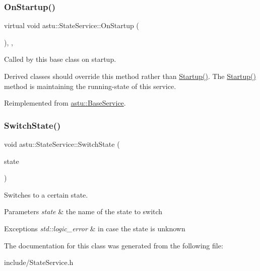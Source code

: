 \subsubsection{\texorpdfstring{On\+Startup()}{OnStartup()}}
{\footnotesize\ttfamily virtual void astu\+::\+State\+Service\+::\+On\+Startup (\begin{DoxyParamCaption}{ }\end{DoxyParamCaption})\hspace{0.3cm}{\ttfamily [override]}, {\ttfamily [protected]}, {\ttfamily [virtual]}}

Called by this base class on startup.

Derived classes should override this method rather than {\ttfamily \hyperlink{classastu_1_1BaseService_a59dade033dcb44dd32155c526a3a58e2}{Startup()}}. The {\ttfamily \hyperlink{classastu_1_1BaseService_a59dade033dcb44dd32155c526a3a58e2}{Startup()}} method is maintaining the running-\/state of this service. 

Reimplemented from \hyperlink{classastu_1_1BaseService_ac8710cd2d6dcc990db65e7c8ccfbc5ff}{astu\+::\+Base\+Service}.

\mbox{\label{classastu_1_1StateService_a3396bad71a626dd749295375759015d3}} 
\subsubsection{\texorpdfstring{Switch\+State()}{SwitchState()}}
{\footnotesize\ttfamily void astu\+::\+State\+Service\+::\+Switch\+State (\begin{DoxyParamCaption}\item[{const std\+::string \&}]{state }\end{DoxyParamCaption})}

Switches to a certain state.


\begin{DoxyParams}{Parameters}
{\em state} & the name of the state to switch \\
\hline
\end{DoxyParams}

\begin{DoxyExceptions}{Exceptions}
{\em std\+::logic\+\_\+error} & in case the state is unknown \\
\hline
\end{DoxyExceptions}


The documentation for this class was generated from the following file\+:\begin{DoxyCompactItemize}
\item 
include/State\+Service.\+h\end{DoxyCompactItemize}
